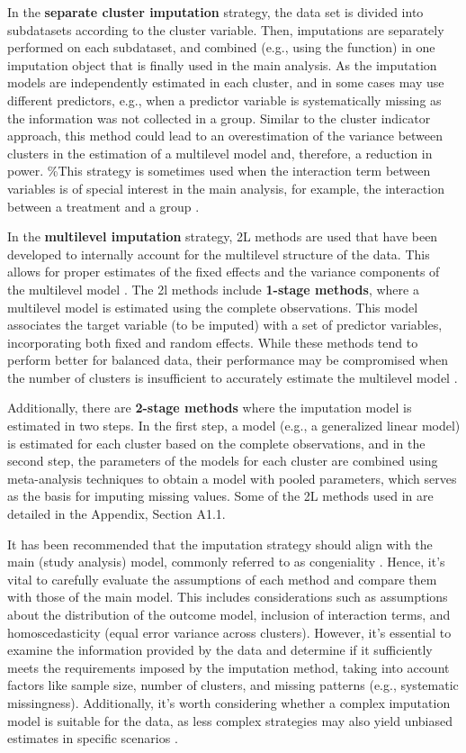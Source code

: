 \documentclass[
  article]{jss}
\begin{document}
In the \textbf{separate cluster imputation} strategy, the data set is
divided into subdatasets according to the cluster variable. Then,
imputations are separately performed on each subdataset, and combined
(e.g., using the  function) in one imputation object that is
finally used in the main analysis. As the imputation models are
independently estimated in each cluster, and in some cases may use
different predictors, e.g., when a predictor variable is systematically
missing as the information was not collected in a group. Similar to the
cluster indicator approach, this method could lead to an overestimation
of the variance between clusters in the estimation of a multilevel model
and, therefore, a reduction in power. \%This strategy is sometimes used
when the interaction term between variables is of special interest in
the main analysis, for example, the interaction between a treatment and
a group \citep{buur18}.

In the \textbf{multilevel imputation} strategy, 2L methods are used that
have been developed to internally account for the multilevel structure
of the data. This allows for proper estimates of the fixed effects and
the variance components of the multilevel model \citep{speidel2018}. The
2l methods include \textbf{1-stage methods}, where a multilevel model is
estimated using the complete observations. This model associates the
target variable (to be imputed) with a set of predictor variables,
incorporating both fixed and random effects. While these methods tend to
perform better for balanced data, their performance may be compromised
when the number of clusters is insufficient to accurately estimate the
multilevel model \citep{grun18}.

Additionally, there are \textbf{2-stage methods} where the imputation
model is estimated in two steps. In the first step, a model (e.g., a
generalized linear model) is estimated for each cluster based on the
complete observations, and in the second step, the parameters of the
models for each cluster are combined using meta-analysis techniques to
obtain a model with pooled parameters, which serves as the basis for
imputing missing values. Some of the 2L methods used in  are
detailed in the Appendix, Section A1.1.

It has been recommended that the imputation strategy should align with
the main (study analysis) model, commonly referred to as congeniality
\citep{meng1994}. Hence, it's vital to carefully evaluate the
assumptions of each method and compare them with those of the main
model. This includes considerations such as assumptions about the
distribution of the outcome model, inclusion of interaction terms, and
homoscedasticity (equal error variance across clusters). However, it's
essential to examine the information provided by the data and determine
if it sufficiently meets the requirements imposed by the imputation
method, taking into account factors like sample size, number of
clusters, and missing patterns (e.g., systematic missingness).
Additionally, it's worth considering whether a complex imputation model
is suitable for the data, as less complex strategies may also yield
unbiased estimates in specific scenarios \citep{bailey2020}.
\end{document}
